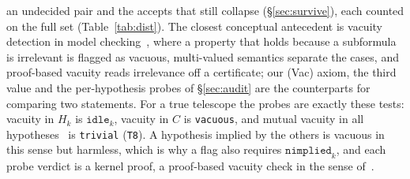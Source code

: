 \documentclass[10pt]{article}
\theoremstyle{definition}
\begin{document}
an undecided pair and the accepts that still collapse (\S\ref{sec:survive}), each counted on the
full set (Table~\ref{tab:dist}). The closest
conceptual antecedent is
vacuity detection in model checking~\cite{beer,kupfermanvardi,gurfinkel,namjoshi}, where a
property that holds because a subformula is irrelevant is flagged as vacuous, multi-valued
semantics separate the cases, and proof-based vacuity reads irrelevance off a certificate;
our (Vac) axiom, the third value and the per-hypothesis probes of \S\ref{sec:audit} are the
counterparts for comparing two statements. For a true telescope the probes are exactly these
tests: vacuity in $H_k$ is $\texttt{idle}_k$, vacuity in $C$ is \texttt{vacuous}, and mutual
vacuity in all hypotheses~\cite{gurfinkel} is \texttt{trivial} (\texttt{T8}). A hypothesis implied
by the others is vacuous in this sense but harmless, which is why a flag also requires
$\texttt{nimplied}_k$, and each probe verdict is a kernel proof, a proof-based vacuity check in
the sense of~\cite{namjoshi}.
\end{document}
